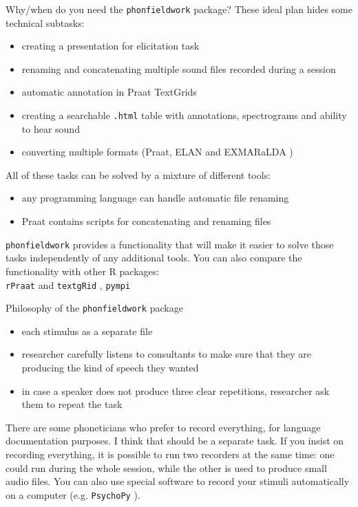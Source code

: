 \documentclass[13pt, t]{beamer}
\begin{document}
\begin{frame}{Why/when do you need the \texttt{phonfieldwork} package?}
These ideal plan hides some technical subtasks:
\begin{itemize}
\item creating a presentation for elicitation task
\item renaming and concatenating multiple sound files recorded during a session
\item automatic annotation in Praat TextGrids {\small \citep{boersma19}}
\item creating a searchable \texttt{.html} table with annotations, spectrograms and ability to hear sound
\item converting multiple formats (Praat, ELAN \citep{brugman04} and EXMARaLDA \citep{schmidt09}) \pause
\end{itemize}
\vfill
All of these tasks can be solved by a mixture of different tools:
\begin{itemize}
\item any programming language can handle automatic  file renaming
\item Praat contains scripts for concatenating and renaming files
\end{itemize}
\pause
\vfill
\texttt{phonfieldwork} provides a functionality that will make it easier to solve those tasks independently of any additional tools. You can also compare the functionality with other R packages:\\ \texttt{rPraat} \citep{borzil16} and \texttt{textgRid} \citep{reidy16}, \texttt{pympi} \citep{lubbers13}
\end{frame}

\begin{frame}{Philosophy of the \texttt{phonfieldwork} package}
\begin{itemize}
\item each stimulus as a separate file
\item researcher carefully listens to consultants to make sure that they are producing the kind of speech they wanted
\item in case a speaker does not produce three clear repetitions, researcher ask them to repeat the task
\end{itemize}

There are some phoneticians who prefer to record everything, for language documentation purposes. I think that should be a separate task. If you insist on recording everything, it is possible to run two recorders at the same time: one could run during the whole session, while the other is used to produce small audio files. You can also use special software to record your stimuli automatically on a computer (e.g. \texttt{PsychoPy} \citep{peirce19}).
\end{frame}
\end{document}
